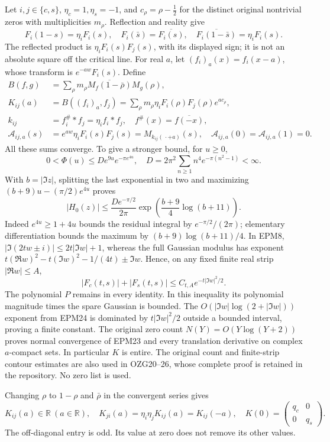 \documentclass[
  10pt,
  a4paper,
]{article}
\begin{document}
Let \(i,j\in\{c,s\}\), \(\eta_c=1,\eta_s=-1\), and
\(c_\rho=\rho-\tfrac12\) for the distinct original nontrivial zeros with
multiplicities \(m_\rho\). Reflection and reality give \[
F_i(1-s)=\eta_iF_i(s),\quad F_i(\bar s)=\overline{F_i(s)},\quad
\overline{F_i(1-\bar s)}=\eta_iF_i(s).
\tag{EPM22}
\] The reflected product is \(\eta_iF_i(s)F_j(s)\), with its displayed
sign; it is not an absolute square off the critical line. For real
\(a\), let \((f_i)_a(x)=f_i(x-a)\), whose transform is
\(e^{-aw}F_i(s)\). Define \[
\begin{aligned}
B(f,g)&=\sum_\rho m_\rho\overline{M_f(1-\bar\rho)}M_g(\rho),\\
K_{ij}(a)&=B((f_i)_a,f_j)
=\sum_\rho m_\rho\eta_iF_i(\rho)F_j(\rho)e^{ac_\rho},\\
k_{ij}&=f_i^\#*f_j=\eta_i f_i*f_j,\quad f^\#(x)=\overline{f(-x)},\\
\mathcal A_{ij,a}(s)&=e^{aw}\eta_iF_i(s)F_j(s)
=M_{k_{ij}(\,\cdot+a)}(s),\quad
\mathcal A_{ij,a}(0)=\mathcal A_{ij,a}(1)=0 .
\end{aligned}\tag{EPM23}
\] All these sums converge. To give a stronger bound, for \(u\ge0\), \[
0<\Phi(u)\le D e^{9u}e^{-\pi e^{4u}},\quad
D=2\pi^2\sum_{n\ge1}n^4e^{-\pi(n^2-1)}<\infty .
\] With \(b=|\Im z|\), splitting the last exponential in two and
maximizing \((b+9)u-(\pi/2)e^{4u}\) proves \[
|H_0(z)|\le\frac{D e^{-\pi/2}}{2\pi}
\exp\left(\frac{b+9}{4}\log(b+11)\right).
\tag{EPM24}
\] Indeed \(e^{4u}\ge1+4u\) bounds the residual integral by
\(e^{-\pi/2}/(2\pi)\); elementary differentiation bounds the maximum by
\((b+9)\log(b+11)/4\). In EPM8, \(|\Im(2tw\pm i)|\le2t|\Im w|+1\),
whereas the full Gaussian modulus has exponent
\(t(\Re w)^2-t(\Im w)^2-1/(4t)\pm\Im w\). Hence, on any fixed finite
real strip \(|\Re w|\le A\), \[
|F_c(t,s)|+|F_s(t,s)|\le C_{t,A}e^{-t|\Im w|^2/2}.
\tag{EPM25}
\] The polynomial \(P\) remains in every identity. In this inequality
its polynomial magnitude times the spare Gaussian is bounded. The
\(O(|\Im w|\log(2+|\Im w|))\) exponent from EPM24 is dominated by
\(t|\Im w|^2/2\) outside a bounded interval, proving a finite constant.
The original zero count \(N(Y)=O(Y\log(Y+2))\) proves normal convergence
of EPM23 and every translation derivative on complex \(a\)-compact sets.
In particular \(K\) is entire. The original count and finite-strip
contour estimates are also used in OZG20--26, whose complete proof is
retained in the repository. No zero list is used.

Changing \(\rho\) to \(1-\rho\) and \(\bar\rho\) in the convergent
series gives \[
K_{ij}(a)\in\mathbb R\ (a\in\mathbb R),\quad
K_{ji}(a)=\eta_i\eta_jK_{ij}(a)=K_{ij}(-a),\quad
K(0)=\begin{pmatrix}q_c&0\\0&q_s\end{pmatrix}.
\tag{EPM26}
\] The off-diagonal entry is odd. Its value at zero does not remove its
other values.
\end{document}
